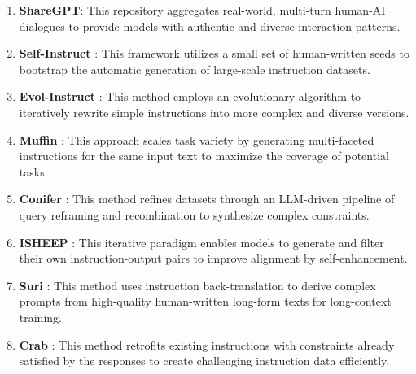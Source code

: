 \begin{enumerate}
    \item \textbf{ShareGPT}: This repository aggregates real-world, multi-turn human-AI dialogues to provide models with authentic and diverse interaction patterns.
    \item \textbf{Self-Instruct} \citep{wang2022self}: This framework utilizes a small set of human-written seeds to bootstrap the automatic generation of large-scale instruction datasets.
    \item \textbf{Evol-Instruct} \citep{xu2023wizardlm}: This method employs an evolutionary algorithm to iteratively rewrite simple instructions into more complex and diverse versions.
    \item \textbf{Muffin} \citep{lou2023muffin}: This approach scales task variety by generating multi-faceted instructions for the same input text to maximize the coverage of potential tasks.
    \item \textbf{Conifer} \citep{sun2024conifer}: This method refines datasets through an LLM-driven pipeline of query reframing and recombination to synthesize complex constraints.
    \item \textbf{ISHEEP} \citep{isheep}: This iterative paradigm enables models to generate and filter their own instruction-output pairs to improve alignment by self-enhancement.
    \item \textbf{Suri} \citep{pham2024suri}: This method uses instruction back-translation to derive complex prompts from high-quality human-written long-form texts for long-context training.
    \item \textbf{Crab} \citep{qi2024constraint}: This method retrofits existing instructions with constraints already satisfied by the responses to create challenging instruction data efficiently.
\end{enumerate}


